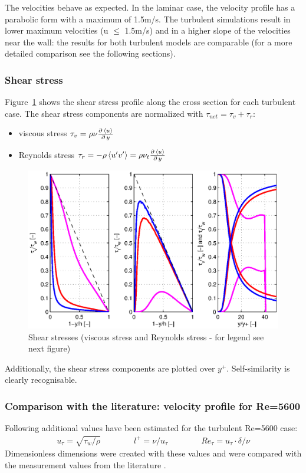 \noii The velocities behave as expected. In the laminar case, the velocity profile has a parabolic form with a maximum of 1.5m/s. The turbulent simulations result in lower maximum velocities (u $\le$ 1.5m/s) and in a higher slope of the velocities near the wall: the results for both turbulent models are comparable (for a more detailed comparison see the following sections).

\subsubsection*{Shear stress}

Figure~\ref{fig:channel-tau} shows the shear stress profile along the cross section for each turbulent case. The shear stress components are normalized with $\tau_{net}=\tau_v+\tau_r$:

\begin{itemize}
\item viscous stress $\tau_v=\rho\nu\frac{\partial\,\left\langle u \right\rangle}{\partial\,y}$
\item Reynolds stress $\tau_r=-\rho\left\langle u' v' \right\rangle=\rho\nu_t\frac{\partial\,\left\langle u \right\rangle}{\partial\,y}$
\end{itemize}

\begin{figure}[!htb]
\centering
\includegraphics[width=1.0\textwidth]{FIGURES/tau.eps}
\caption{Shear stresses (viscous stress and Reynolds stress - for legend see next figure)}
\label{fig:channel-tau}
\end{figure} 

\noindent Additionally, the shear stress components are plotted over $y^+$. Self-similarity is clearly recognisable.



\subsubsection*{Comparison with the literature: velocity profile for Re=5600}\label{ssub:litkim}
Following additional values have been estimated for the turbulent Re=5600 case:
\begin{align}
u_\tau=\sqrt{\tau_w/\rho}
\qquad\qquad
l^+=\nu/u_\tau
\qquad\qquad
Re_\tau=u_\tau\cdot\delta/\nu
\end{align}
Dimensionless dimensions were created with these values and were compared with the measurement values from the literature \citep{kim1987}.

